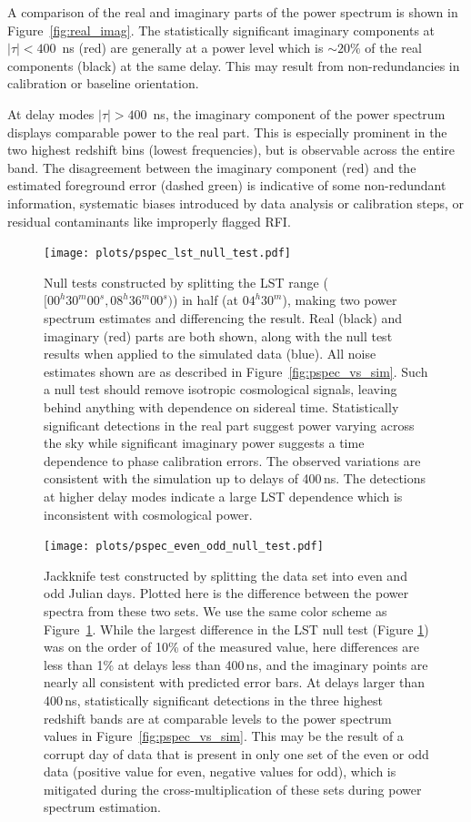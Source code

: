 A comparison of the real and imaginary parts of the power spectrum
is shown in Figure~\ref{fig:real_imag}.
The statistically significant imaginary components at
$ |\tau| < 400 $~ns (red) are generally at a power level
which is $ \sim 20\% $ of the real components (black) at the same delay.
This may result from non-redundancies in calibration or baseline orientation.

At delay modes $ |\tau| > 400 $~ns, the imaginary
component of the power spectrum displays comparable power to the 
real part. This is especially prominent in the two highest redshift bins (lowest frequencies), but is observable across the entire band.
The disagreement between the imaginary component (red) and the estimated foreground error (dashed green) is indicative of some non-redundant information, systematic biases introduced by data analysis or calibration steps, or residual contaminants like improperly flagged RFI.

\begin{figure}[tp]
\centering
\texttt{[image: plots/pspec\_lst\_null\_test.pdf]}
\caption{Null tests constructed by splitting the LST range ($[00^{h}30^{m}00^{s}, 08^{h}36^{m}00^{s}) $) in half (at $04^{h}30^{m}$), making two
power spectrum estimates and differencing the result. Real (black) and imaginary (red) parts are both shown, along with the null test results
when applied to the simulated data (blue). All noise estimates shown are as described in Figure~\ref{fig:pspec_vs_sim}.
Such a null test should remove
isotropic cosmological signals, leaving behind anything with dependence on sidereal time. Statistically significant detections in the real part suggest power varying across the sky while significant imaginary power suggests a time dependence to phase calibration errors. The observed variations are consistent with the simulation up to delays of 400\,ns.
The detections at higher delay modes indicate a large 
LST dependence which is inconsistent with cosmological power.}
\label{fig:lst_null_test}
\end{figure}

\begin{figure}[tp]
\centering
\texttt{[image: plots/pspec\_even\_odd\_null\_test.pdf]}
\caption{Jackknife test constructed by splitting the data set into even and odd Julian days. Plotted here is the difference between the power spectra from these two sets. We use the same color scheme as Figure~\ref{fig:lst_null_test}. While the largest difference in the LST null test
(Figure \ref{fig:lst_null_test}) was on the order of 10\% of the measured value, here differences are less than 1\% at delays less than 400\,ns, and the imaginary points are nearly all consistent with predicted error bars. At delays larger than 400\,ns, statistically significant detections
in the three highest redshift bands are at comparable
levels to the power spectrum values in Figure~\ref{fig:pspec_vs_sim}.
This may be the result of a corrupt day of data that is present in only one set of the even or odd data (positive value for even, negative values for odd), which is mitigated during the cross-multiplication of these sets during power spectrum estimation.}
\label{fig:even_odd_null_test}
\end{figure}

